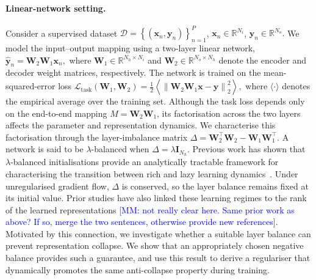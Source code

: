 \documentclass{article} %
\newcommand{\wa}{\mathbf{W}_1}
\newcommand{\wb}{\mathbf{W}_2}
\theoremstyle{remark}
\newcommand{\mm}[1]{\textcolor{blue}{[MM: #1]}}
\begin{document}
\paragraph{Linear-network setting.}
Consider a supervised dataset
$
\mathcal{D}
=
\left\{
(\mathbf{x}_n,\mathbf{y}_n)
\right\}_{n=1}^{P}
$, $
\mathbf{x}_n\in\mathbb{R}^{N_i} 
$, $
\mathbf{y}_n\in\mathbb{R}^{N_o}.
$
We model the input--output mapping using a two-layer linear network, $\widehat{\mathbf{y}}_n
=
\wb\wa\mathbf{x}_n,$
where $\wa\in\mathbb{R}^{N_h\times N_i}$ and
$\wb\in\mathbb{R}^{N_o\times N_h}$ denote the encoder and decoder weight
matrices, respectively. The network is trained on the mean-squared-error
loss
$
\mathcal{L}_{\mathrm{task}}(\wa,\wb)
=
\frac{1}{2}
\left\langle
\left\|
\wb\wa\mathbf{x}-\mathbf{y}
\right\|_2^2
\right\rangle,$
where $\langle\cdot\rangle$ denotes the empirical average over the training
set. Although the task loss depends only on the end-to-end mapping
$M=\wb\wa$, its factorisation across the two layers affects the parameter
and representation dynamics. We characterise this factorisation through
the layer-imbalance matrix
$
\Delta
=
\wb^\top\wb-\wa\wa^\top.
$
A network is said to be $\lambda$-balanced when
$
\Delta
=
\lambda\mathbf{I}_{N_h}.$
Previous work has shown that $\lambda$-balanced initialisations provide an analytically tractable framework for characterising the transition between rich and lazy learning dynamics~\citep{domine2024lazy,nam2025position}. Under unregularised gradient flow, $\Delta$ is conserved, so the layer balance remains fixed at its initial value. Prior studies have also linked these learning regimes to the rank of the learned representations \mm{not really clear here. Same prior work as above? If so, merge the two sentences, otherwise provide new references}. Motivated by this connection, we investigate whether a suitable layer balance can prevent representation collapse. We show that an appropriately chosen negative balance provides such a guarantee, and use this result to derive a regulariser that dynamically promotes the same anti-collapse property during training.
\end{document}
